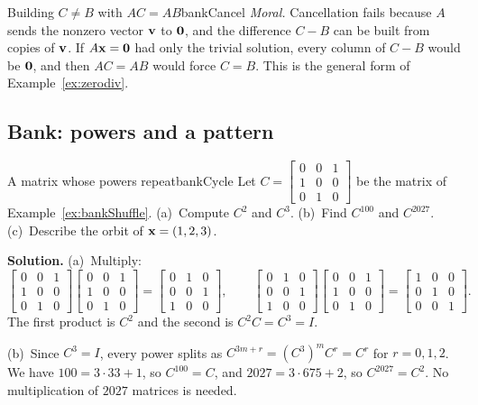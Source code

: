 \documentclass[11pt]{article}
\begin{document}
\begin{exmp}{Building $C\neq B$ with $AC=AB$}{bankCancel}
\emph{Moral.} Cancellation fails because $A$ sends the nonzero vector $\mathbf{v}$ to $\mathbf{0}$, and the difference $C-B$ can be built from copies of $\mathbf{v}$. If $A\mathbf{x}=\mathbf{0}$ had only the trivial solution, every column of $C-B$ would be $\mathbf{0}$, and then $AC=AB$ would force $C=B$. This is the general form of Example~\ref{ex:zerodiv}.
\end{exmp}

\subsection*{Bank: powers and a pattern}

\begin{exmp}{A matrix whose powers repeat}{bankCycle}
Let $C=\begin{bmatrix}0&0&1\\1&0&0\\0&1&0\end{bmatrix}$ be the matrix of Example~\ref{ex:bankShuffle}. (a)~Compute $C^2$ and $C^3$. (b)~Find $C^{100}$ and $C^{2027}$. (c)~Describe the orbit of $\mathbf{x}=(1,2,3)$.

\textbf{Solution.} (a)~Multiply:
\[
\begin{bmatrix}0&0&1\\1&0&0\\0&1&0\end{bmatrix}\begin{bmatrix}0&0&1\\1&0&0\\0&1&0\end{bmatrix}=\begin{bmatrix}0&1&0\\0&0&1\\1&0&0\end{bmatrix},\qquad
\begin{bmatrix}0&1&0\\0&0&1\\1&0&0\end{bmatrix}\begin{bmatrix}0&0&1\\1&0&0\\0&1&0\end{bmatrix}=\begin{bmatrix}1&0&0\\0&1&0\\0&0&1\end{bmatrix}.
\]
The first product is $C^2$ and the second is $C^2C=C^3=I$.

(b)~Since $C^3=I$, every power splits as $C^{3m+r}=(C^3)^mC^r=C^r$ for $r=0,1,2$. We have $100=3\cdot33+1$, so $C^{100}=C$, and $2027=3\cdot675+2$, so $C^{2027}=C^2$. No multiplication of $2027$ matrices is needed.


\end{exmp}
\end{document}

